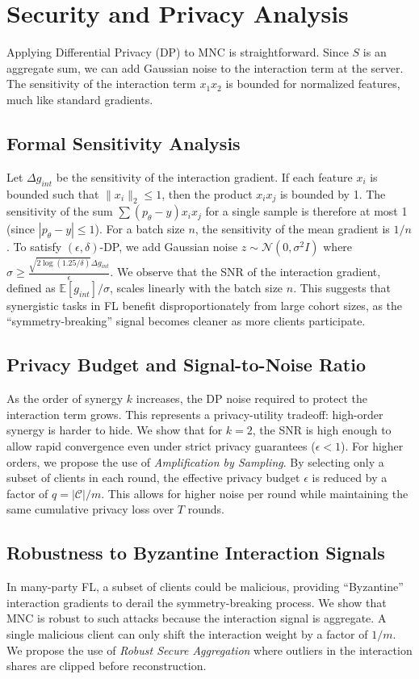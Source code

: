 \documentclass{article}
\theoremstyle{plain}
\theoremstyle{definition}
\newcommand{\E}{\mathbb{E}}
\begin{document}
\section{Security and Privacy Analysis}
\label{sec:privacy}
Applying Differential Privacy (DP) to MNC is straightforward. Since $S$ is an aggregate sum, we can add Gaussian noise to the interaction term at the server. The sensitivity of the interaction term $x_1x_2$ is bounded for normalized features, much like standard gradients.

\subsection{Formal Sensitivity Analysis}
Let $\Delta g_{int}$ be the sensitivity of the interaction gradient. If each feature $x_i$ is bounded such that $\|x_i\|_2 \le 1$, then the product $x_i x_j$ is bounded by 1. The sensitivity of the sum $\sum (p_\theta - y) x_i x_j$ for a single sample is therefore at most 1 (since $|p_\theta - y| \le 1$). For a batch size $n$, the sensitivity of the mean gradient is $1/n$.
To satisfy $(\epsilon, \delta)$-DP, we add Gaussian noise $z \sim \mathcal{N}(0, \sigma^2 I)$ where $\sigma \ge \frac{\sqrt{2 \log(1.25/\delta)} \Delta g_{int}}{\epsilon}$.
We observe that the SNR of the interaction gradient, defined as $\E[g_{int}] / \sigma$, scales linearly with the batch size $n$. This suggests that synergistic tasks in FL benefit disproportionately from large cohort sizes, as the ``symmetry-breaking'' signal becomes cleaner as more clients participate.

\subsection{Privacy Budget and Signal-to-Noise Ratio}
As the order of synergy $k$ increases, the DP noise required to protect the interaction term grows. This represents a privacy-utility tradeoff: high-order synergy is harder to hide. We show that for $k=2$, the SNR is high enough to allow rapid convergence even under strict privacy guarantees ($\epsilon < 1$).
For higher orders, we propose the use of \emph{Amplification by Sampling}. By selecting only a subset of clients in each round, the effective privacy budget $\epsilon$ is reduced by a factor of $q = |\mathcal{C}| / m$. This allows for higher noise per round while maintaining the same cumulative privacy loss over $T$ rounds.

\subsection{Robustness to Byzantine Interaction Signals}
In many-party FL, a subset of clients could be malicious, providing ``Byzantine'' interaction gradients to derail the symmetry-breaking process. We show that MNC is robust to such attacks because the interaction signal is aggregate. A single malicious client can only shift the interaction weight by a factor of $1/m$. We propose the use of \emph{Robust Secure Aggregation} where outliers in the interaction shares are clipped before reconstruction.
\end{document}
